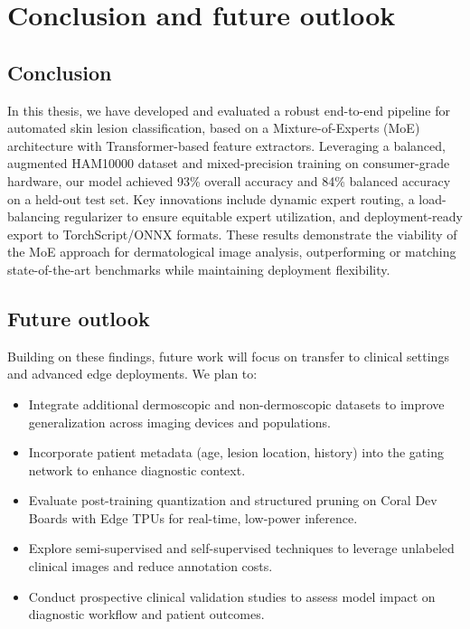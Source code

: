 \chapter*{Conclusion and future outlook}

\label{sec:conclusion}

\clearpage

\section*{Conclusion}
In this thesis, we have developed and evaluated a robust end-to-end pipeline for automated skin lesion classification, based on a Mixture-of-Experts (MoE) architecture with Transformer-based feature extractors. Leveraging a balanced, augmented HAM10000 dataset and mixed-precision training on consumer-grade hardware, our model achieved 93\% overall accuracy and 84\% balanced accuracy on a held-out test set. Key innovations include dynamic expert routing, a load-balancing regularizer to ensure equitable expert utilization, and deployment-ready export to TorchScript/ONNX formats. These results demonstrate the viability of the MoE approach for dermatological image analysis, outperforming or matching state-of-the-art benchmarks while maintaining deployment flexibility.

\section*{Future outlook}
Building on these findings, future work will focus on transfer to clinical settings and advanced edge deployments. We plan to:
\begin{itemize}
  \item Integrate additional dermoscopic and non-dermoscopic datasets to improve generalization across imaging devices and populations.
  \item Incorporate patient metadata (age, lesion location, history) into the gating network to enhance diagnostic context.
  \item Evaluate post-training quantization and structured pruning on Coral Dev Boards with Edge TPUs for real-time, low-power inference.
  \item Explore semi-supervised and self-supervised techniques to leverage unlabeled clinical images and reduce annotation costs.
  \item Conduct prospective clinical validation studies to assess model impact on diagnostic workflow and patient outcomes.
\end{itemize}


